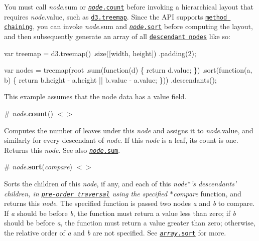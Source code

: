 You must call {\itshape node}.sum or \href{#node_count}{\tt {\itshape node}.count} before invoking a hierarchical layout that requires {\itshape node}.value, such as \href{#treemap}{\tt d3.\+treemap}. Since the A\+PI supports \href{https://en.wikipedia.org/wiki/Method_chaining}{\tt method chaining}, you can invoke {\itshape node}.sum and \href{#node_sort}{\tt {\itshape node}.sort} before computing the layout, and then subsequently generate an array of all \href{#node_descendants}{\tt descendant nodes} like so\+:


\begin{DoxyCode}
var treemap = d3.treemap()
    .size([width, height])
    .padding(2);

var nodes = treemap(root
    .sum(function(d) \{ return d.value; \})
    .sort(function(a, b) \{ return b.height - a.height || b.value - a.value; \}))
  .descendants();
\end{DoxyCode}


This example assumes that the node data has a value field.

\label{_node_count}%
\# {\itshape node}.{\bfseries count}() \href{https://github.com/d3/d3-hierarchy/blob/master/src/hierarchy/count.js}{\tt $<$$>$}

Computes the number of leaves under this {\itshape node} and assigns it to {\itshape node}.value, and similarly for every descendant of {\itshape node}. If this {\itshape node} is a leaf, its count is one. Returns this {\itshape node}. See also \href{#node_sum}{\tt {\itshape node}.sum}.

\label{_node_sort}%
\# {\itshape node}.{\bfseries sort}({\itshape compare}) \href{https://github.com/d3/d3-hierarchy/blob/master/src/hierarchy/sort.js}{\tt $<$$>$}

Sorts the children of this {\itshape node}, if any, and each of this {\itshape node$\ast$’s descendants’ children, in \href{#node_eachBefore}{\tt pre-\/order traversal} using the specified $\ast$compare} function, and returns this {\itshape node}. The specified function is passed two nodes {\itshape a} and {\itshape b} to compare. If {\itshape a} should be before {\itshape b}, the function must return a value less than zero; if {\itshape b} should be before {\itshape a}, the function must return a value greater than zero; otherwise, the relative order of {\itshape a} and {\itshape b} are not specified. See \href{https://developer.mozilla.org/en-US/docs/Web/JavaScript/Reference/Global_Objects/Array/sort}{\tt {\itshape array}.sort} for more.

